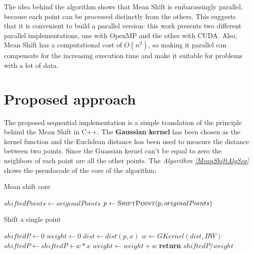 \documentclass[10pt,twocolumn,letterpaper]{article}
\begin{document}
The idea behind the algorithm shows that Mean Shift is embarassingly parallel, because each point can be processed distinctly from the others. This suggests that it is convenient to build a parallel version: this work presents two different parallel implementations, one with OpenMP and the other with CUDA.
Also, Mean Shift has a computational cost of $O(n^{2})$, so making it parallel can compensate for the increasing execution time and make it suitable for problems with a lot of data.


\section{Proposed approach}
The proposed sequential implementation is a simple translation of the principle behind the Mean Shift in C++. The \textbf{Gaussian kernel} has been chosen as the kernel function and the Euclidean distance has been used to measure the distance between two points. Since the Guassian kernel can't be equal to zero the neighbors of each point are all the other points. The \emph{Algorithm \ref{MeanShiftAlgSeq}} shows the pseudocode of the core of the algorithm:

\begin{algorithm}
\caption{Mean shift core}
\label{MeanShiftAlgSeq}
\begin{algorithmic}
	\State$shiftedPoints \gets originalPoints$
               \State $p\gets \Call{ShiftPoint}{p, originalPoints}$
            \EndFor
    \EndWhile
\EndFunction
\end{algorithmic}
\end{algorithm}

\begin{algorithm}
\caption{Shift a single point}
\label{ShiftPointAlgSeq}
\begin{algorithmic}
	\State $shiftedP\gets0$
	\State $weight\gets0$
    		\State$dist \gets dist(p, x)$
    		\State $w \gets GKernel(dist, BW)$
    		\State $shiftedP \gets shiftedP + w*x$
    		\State $weight \gets weight + w$
    \EndFor
    \State \textbf{return} $shiftedP/weight$
\EndFunction

\end{algorithmic}
\end{algorithm}
\end{document}
